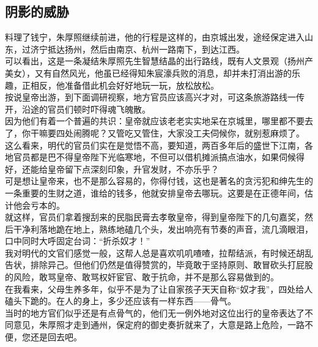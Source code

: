 \begin{multicols}{\theparacolNo}
\subsection{阴影的威胁}
料理了钱宁，朱厚照继续前进，他的行程是这样的，由京城出发，途经保定进入山东，过济宁抵达扬州，然后由南京、杭州一路南下，到达江西。\\

可以看出，这是一条凝结朱厚照先生智慧结晶的出行路线，既有人文景观（扬州产美女），又有自然风光，他虽已经得知朱宸濠兵败的消息，却并未打消出游的乐趣，正相反，他准备借此机会好好地玩一玩，放松放松。\\

按说皇帝出游，到下面调研视察，地方官员应该高兴才对，可这条旅游路线一传开，沿途的官员们顿时吓得魂飞魄散。\\

因为他们有着一个普遍的共识：皇帝就应该老老实实地呆在京城里，哪里都不要去了，你干嘛要四处闹腾呢？又管吃又管住，大家没工夫伺候你，就别惹麻烦了。\\

这么看来，明代的官员们实在是觉悟不高，要知道，两百多年后的盛世下江南，各地官员都是巴不得皇帝陛下光临寒地，不但可以借机摊派搞点油水，如果伺候得好，还能给皇帝留下点深刻印象，升官发财，不亦乐乎？\\

可是想让皇帝来，也不是那么容易的，你得付钱，这也是著名的贪污犯和绅先生的一条重要的生财之道，谁给的钱多，他就安排皇帝去哪玩。这要是在正德年间，估计他会亏本的。\\

就这样，官员们拿着搜刮来的民脂民膏去孝敬皇帝，得到皇帝陛下的几句嘉奖，然后干净利落地跪在地上，熟练地磕几个头，发出响亮有节奏的声音，流几滴眼泪，口中同时大呼固定台词：“折杀奴才！”\\

我对明代的文官们感觉一般，这帮人总是喜欢叽叽喳喳，拉帮结派，有时候还胡乱告状，排除异己。但他们仍然是值得赞赏的，毕竟敢于坚持原则、敢冒砍头打屁股的风险，敢骂皇帝、敢骂权奸宦官、敢于抗命，并不是那么容易做到的。\\

在我看来，父母生养多年，似乎不是为了让自家孩子天天自称“奴才我”，四处给人磕头下跪的。在人的身上，多少还应该有一样东西——骨气。\\

当时的地方官们似乎还是有点骨气的，他们无一例外地对这位出行的皇帝表达了不同意见，朱厚照才走到通州，保定府的御史奏折就来了，大意是路上危险，一路不便，您还是回去吧。\\


\end{multicols}
